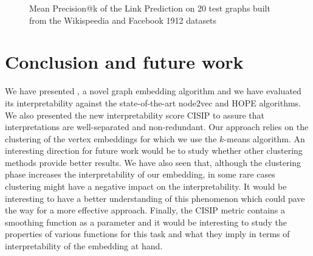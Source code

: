 \begin{figure}
   \centering
    \caption[Precision@k results of the Link Prediction experiment]{Mean Precision@k of the Link Prediction on 20 test graphs built from the Wikispeedia and Facebook 1912 datasets}
    \label{fig:lp_results}
\end{figure}

\section{Conclusion and future work}\label{sec:conclusion}
We have presented \parfaite{}, a novel graph embedding algorithm and we have evaluated its interpretability against the state-of-the-art node2vec and HOPE algorithms. We also presented the new interpretability score CISIP to assure that interpretations are well-separated and non-redundant.
Our approach relies on the clustering of the vertex embeddings for which we use the $k$-means algorithm. An interesting direction for future work would be to study whether other clustering methods provide better results. We have also seen that, although the clustering phase increases the interpretability of our embedding, in some rare cases clustering might have a negative impact on the interpretability. It would be interesting to have a better understanding of this phenomenon which could pave the way for a more effective approach.  Finally, the CISIP metric contains a smoothing function as a parameter and it would be interesting to study the properties of various functions for this task and what they imply in terms of interpretability of the embedding at hand.

